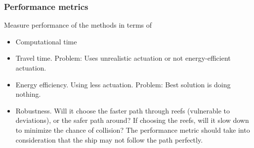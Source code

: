 \subsubsection{Performance metrics}
Measure performance of the methods in terms of 
\begin{itemize}
	\item Computational time
	\item Travel time. Problem: Uses unrealistic actuation or not energy-efficient actuation.
	\item Energy efficiency. Using less actuation. Problem: Best solution is doing nothing.
	\item Robustness. Will it choose the faster path through reefs (vulnerable to deviations), or the safer path around? If choosing the reefs, will it slow down to minimize the chance of collision? The performance metric should take into consideration that the ship may not follow the path perfectly.
\end{itemize}

